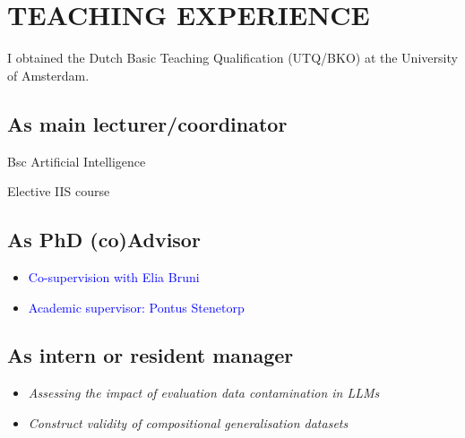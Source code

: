 \section{TEACHING EXPERIENCE}

I obtained the Dutch Basic Teaching Qualification (UTQ/BKO) at the University of Amsterdam.\\

\subsection{As main lecturer/coordinator}
{
{Bsc Artificial Intelligence}

{
{Elective IIS course}

\subsection{As PhD (co)Advisor}
{
{\begin{itemize}
  \item[] \textcolor{blue}{\normalfont Co-supervision with Elia Bruni\vspace{1mm}}
\end{itemize}
}}

{
{\begin{itemize}
  \item[] \textcolor{blue}{\normalfont Academic supervisor: Pontus Stenetorp\vspace{1mm}}
\end{itemize}
}}

\subsection{As intern or resident manager}

{
{\begin{itemize}
  \item[] \textit{Assessing the impact of evaluation data contamination in LLMs}
\end{itemize}
}}

{
{\begin{itemize}
  \item[] \textit{Construct validity of compositional generalisation datasets}
\end{itemize}
}}

}}
